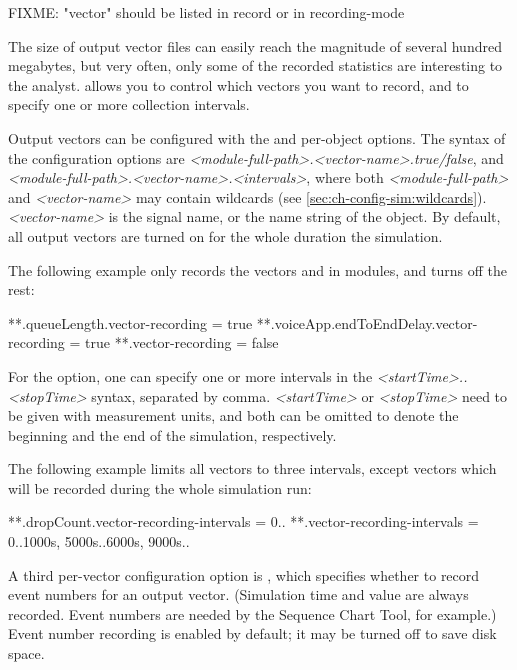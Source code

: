 FIXME: "vector" should be listed in record or in recording-mode

The size of output vector files can easily reach the magnitude of several
hundred megabytes, but very often, only some of the recorded statistics are
interesting to the analyst. {\opp} allows you to control which vectors you
want to record, and to specify one or more collection intervals.

Output vectors can be configured with the  and
 per-object options. The syntax of the
configuration options are
\textit{<module-full-path>.<vector-name>.}\textit{true/false},
and \textit{<module-full-path>.<vector-name>.}\textit{<intervals>},
where both \textit{<module-full-path>} and \textit{<vector-name>} may
contain wildcards (see \ref{sec:ch-config-sim:wildcards}).
\textit{<vector-name>} is the signal name, or the name string of the
 object. By default, all output vectors are turned
on for the whole duration the simulation.

The following example only records the  vectors and
 in  modules, and turns off the rest:

\begin{inifile}
**.queueLength.vector-recording = true
**.voiceApp.endToEndDelay.vector-recording = true
**.vector-recording = false
\end{inifile}

For the  option, one can specify
one or more intervals in the \textit{<startTime>..<stopTime>} syntax,
separated by comma. \textit{<startTime>} or \textit{<stopTime>} need
to be given with measurement units, and both can be omitted to denote
the beginning and the end of the simulation, respectively.

The following example limits all vectors to three intervals, except
 vectors which will be recorded during the whole
simulation run:

\begin{inifile}
**.dropCount.vector-recording-intervals = 0..
**.vector-recording-intervals = 0..1000s, 5000s..6000s, 9000s..
\end{inifile}

A third per-vector configuration option is ,
which specifies whether to record event numbers for an output vector.
(Simulation time and value are always recorded. Event numbers are needed
by the Sequence Chart Tool, for example.) Event number recording is enabled
by default; it may be turned off to save disk space.

